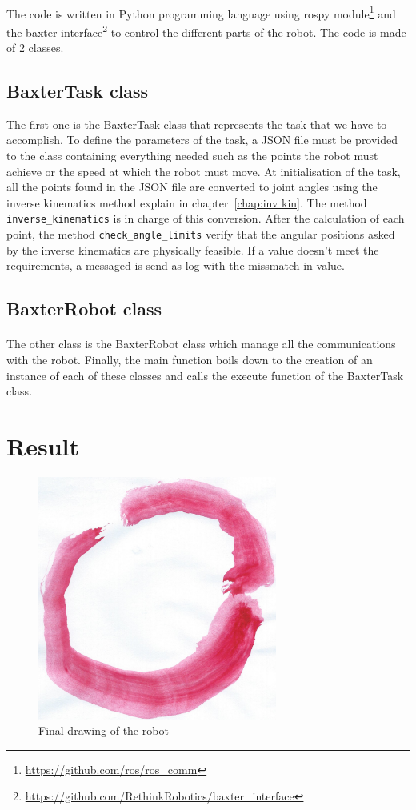 \paragraph{}The code is written in Python programming language using rospy module\footnote{\url{https://github.com/ros/ros_comm}} and the baxter interface\footnote{\url{https://github.com/RethinkRobotics/baxter_interface}} to control the different parts of the robot. The code is made of 2 classes. 

\subsection{BaxterTask class}
The first one is the BaxterTask class that represents the task that we have to accomplish. To define the parameters of the task, a JSON file must be provided to the class containing everything needed such as the points the robot must achieve or the speed at which the robot must move. At initialisation of the task, all the points found in the JSON file are converted to joint angles using the inverse kinematics method explain in chapter~\ref{chap:inv kin}. The method \lstinline[language=Python, style=pythonColor]{inverse_kinematics} is in charge of this conversion. After the calculation of each point, the method \lstinline[language=Python, style=pythonColor]{check_angle_limits} verify that the angular positions asked by the inverse kinematics are physically feasible. If a value doesn't meet the requirements, a messaged is send as log with the missmatch in value.

\subsection{BaxterRobot class}
\paragraph{}The other class is the BaxterRobot class which manage all the communications with the robot. Finally, the main function boils down to the creation of an instance of each of these classes and calls the execute function of the BaxterTask class.


\section{Result}
 \begin{figure}[!ht]
	\centering
    \includegraphics[width = 0.7\textwidth]{Images/masterpiece-cropped.jpg}
    \caption{Final drawing of the robot}
    \label{fig:masterpiece}
\end{figure}